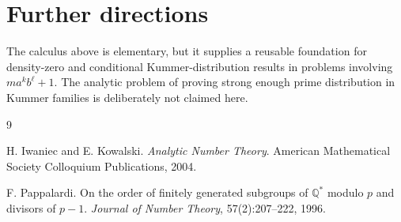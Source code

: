 \documentclass[11pt]{article}
\newcommand{\1}{\mathbf 1}
\begin{document}
\section{Further directions}

The calculus above is elementary, but it supplies a reusable foundation for density-zero and conditional Kummer-distribution results in problems involving \(m a^k b^\ell+1\).  The analytic problem of proving strong enough prime distribution in Kummer families is deliberately not claimed here.


\begin{thebibliography}{9}

H. Iwaniec and E. Kowalski.
\newblock \emph{Analytic Number Theory}.
\newblock American Mathematical Society Colloquium Publications, 2004.

F. Pappalardi.
\newblock On the order of finitely generated subgroups of \(\mathbb Q^*\) modulo \(p\) and divisors of \(p-1\).
\newblock \emph{Journal of Number Theory}, 57(2):207--222, 1996.

\end{thebibliography}
\end{document}
